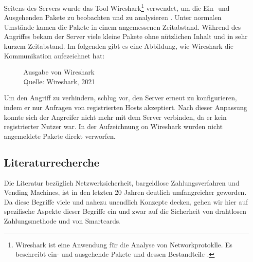 Seitens des Servers wurde das Tool Wireshark\footnote{Wireshark ist eine Anwendung für die Analyse von Networkprotoklle.
Es beschreibt ein- und ausgehende Pakete und dessen Bestandteile \cite{refst:wisa}.} verwendet, um die Ein- und Ausgehenden
Pakete zu beobachten und zu analysieren \cite{refart:UBEC}. Unter normalen Umstände kamen die Pakete in einem angemessenen
Zeitabstand. Während des Angriffes bekam der Server viele kleine Pakete ohne nützlichen Inhalt und in sehr kurzem Zeitabstand.
Im folgenden gibt es eine Abbildung, wie Wireshark die Kommunikation aufezeichnet hat:

\begin{figure}[H]
  \caption{Ausgabe von Wireshark \\Quelle: Wireshark, 2021}
  \label{fig:refst_wisa}
\end{figure}

Um den Angriff zu verhindern, schlug \cite{refip:NYRS} vor, den Server erneut zu konfigurieren, indem er nur Anfragen von
registrierten Hosts akzeptiert. Nach dieser Anpassung konnte sich der Angreifer nicht mehr mit dem Server verbinden, da 
er kein registrierter Nutzer war. In der Aufzeichnung on Wireshark wurden nicht angemeldete Pakete direkt verworfen.



\subsection{Literaturrecherche}

Die Literatur bezüglich Netzwerksicherheit, bargeldlose Zahlungsverfahren und Vending Machines, ist in den letzten 20 
Jahren deutlich umfangreicher geworden. Da diese Begriffe viele und nahezu unendlich Konzepte decken, gehen wir hier
auf spezifische Aspekte dieser Begriffe ein und zwar auf die Sicherheit von drahtlosen Zahlungsmethode und von 
Smartcards. 

